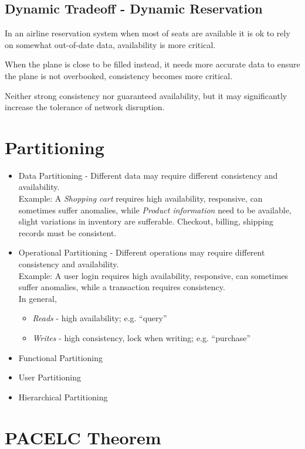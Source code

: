 \subsection{Dynamic Tradeoff - Dynamic Reservation}
In an airline reservation system when most of seats are available it is ok to rely on somewhat out-of-date data, availability
is more critical.

When the plane is close to be filled instead, it needs
more accurate data to ensure the plane is not
overbooked, consistency becomes more critical.

Neither strong consistency nor guaranteed
availability, but it may significantly increase the
tolerance of network disruption.

\section{Partitioning}
\begin{itemize}
	\item Data Partitioning - Different data may require different
   consistency and availability.\\
   Example:
   A \textit{Shopping cart} requires high availability, responsive, can
sometimes suffer anomalies, while \textit{Product information} need to be available, slight variations in inventory are sufferable.
Checkout, billing, shipping records must be consistent.
	\item Operational Partitioning - Different operations may require different consistency and availability.\\
   Example:
   A user login requires high availability, responsive, can sometimes suffer anomalies, while a transaction requires consistency.\\
   In general,
   \begin{itemize}
   	\item \textit{Reads} -  high availability; e.g. ``query''
	   \item \textit{Writes} -  high consistency, lock when writing; e.g. ``purchase''
   \end{itemize}
	\item Functional Partitioning
	\item User Partitioning
	\item Hierarchical Partitioning
\end{itemize}


\section{PACELC Theorem}

